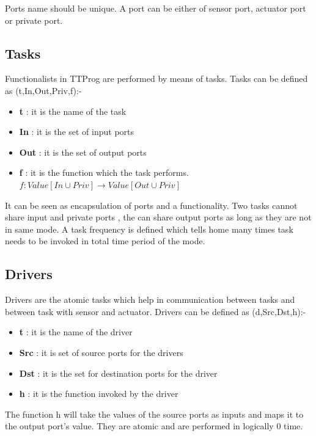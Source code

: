 \documentclass[16pt]{report}
\begin{document}
Ports name should be unique. A port can be either of sensor port, actuator port or private port.


\subsection{Tasks}
Functionalists in TTProg are performed by means of tasks. 
Tasks can be defined as (t,In,Out,Priv,f):-
\begin{itemize}
    \item \textbf{t} : it is the name of the task
    \item \textbf{In} : it is the set of input ports
    \item \textbf{Out} : it is the set of output ports
    \item \textbf{f} : it is the function which the task performs. $f: Value[In \cup Priv] \rightarrow  Value[Out \cup Priv]$
\end{itemize}
It can be seen as encapsulation of ports and a functionality. Two tasks cannot share input and private ports , the can share output ports as long as they are not in same mode. A task frequency is defined which tells home many times  task needs to be invoked in total time period of the mode.

\subsection{Drivers}
Drivers are the atomic tasks which help in communication between tasks and between task with sensor and actuator.
Drivers can be defined as (d,Src,Dst,h):-
\begin{itemize}
    \item \textbf{t} : it is the name of the driver
    \item \textbf{Src} : it is set of source ports for the drivers
    \item \textbf{Dst} : it is the set for destination ports for the driver
    \item \textbf{h} : it is the function invoked by the driver
\end{itemize}
The function h will take the values of the source ports as inputs and maps it to the output port's value. They are atomic and are performed in logically 0 time.
\end{document}

